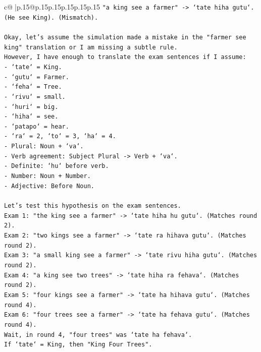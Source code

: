 \documentclass{article}
\begin{document}
{\begin{supertabular}{c@{$\;$}|p{.15\linewidth}@{}p{.15\linewidth}p{.15\linewidth}p{.15\linewidth}p{.15\linewidth}p{.15\linewidth}}
{{{\texttt{"a king see a farmer" {-}> `tate hiha gutu`. (He see King). (Mismatch).} \\
\\ 
\texttt{Okay, let's assume the simulation made a mistake in the "farmer see king" translation or I am missing a subtle rule.} \\
\texttt{However, I have enough to translate the exam sentences if I assume:} \\
\texttt{{-} `tate` = King.} \\
\texttt{{-} `gutu` = Farmer.} \\
\texttt{{-} `feha` = Tree.} \\
\texttt{{-} `rivu` = small.} \\
\texttt{{-} `huri` = big.} \\
\texttt{{-} `hiha` = see.} \\
\texttt{{-} `patapo` = hear.} \\
\texttt{{-} `ra` = 2, `to` = 3, `ha` = 4.} \\
\texttt{{-} Plural: Noun + `va`.} \\
\texttt{{-} Verb agreement: Subject Plural {-}> Verb + `va`.} \\
\texttt{{-} Definite: `hu` before verb.} \\
\texttt{{-} Number: Noun + Number.} \\
\texttt{{-} Adjective: Before Noun.} \\
\\ 
\texttt{Let's test this hypothesis on the exam sentences.} \\
\texttt{Exam 1: "the king see a farmer" {-}> `tate hiha hu gutu`. (Matches round 2).} \\
\texttt{Exam 2: "two kings see a farmer" {-}> `tate ra hihava gutu`. (Matches round 2).} \\
\texttt{Exam 3: "a small king see a farmer" {-}> `tate rivu hiha gutu`. (Matches round 2).} \\
\texttt{Exam 4: "a king see two trees" {-}> `tate hiha ra fehava`. (Matches round 2).} \\
\texttt{Exam 5: "four kings see a farmer" {-}> `tate ha hihava gutu`. (Matches round 4).} \\
\texttt{Exam 6: "four trees see a farmer" {-}> `tate ha fehava gutu`. (Matches round 4).} \\
\texttt{Wait, in round 4, "four trees" was `tate ha fehava`.} \\
\texttt{If `tate` = King, then "King Four Trees".} \\
}}}
\end{supertabular}}
\end{document}
